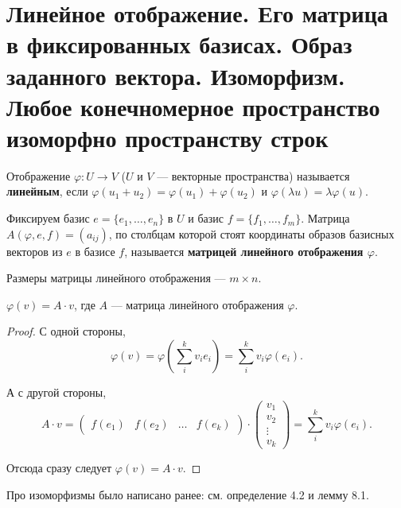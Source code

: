 \section{Линейное отображение. Его матрица в фиксированных базисах. Образ заданного вектора. Изоморфизм. Любое конечномерное пространство изоморфно пространству строк}

\begin{definition}
    Отображение $\varphi: U \rightarrow V$ ($U$ и $V$ --- векторные пространства) называется \textbf{линейным}, если $\varphi(u_1 + u_2) = \varphi(u_1) + \varphi(u_2)$ и $\varphi(\lambda u) = \lambda\varphi(u)$.
\end{definition}

\begin{definition}
    Фиксируем базис $e = \{e_1, \ldots, e_n\}$ в $U$ и базис $f = \{f_1, \ldots, f_m\}$. Матрица $A(\varphi, e, f) = (a_{ij})$, по столбцам которой стоят координаты образов базисных векторов из $e$ в базисе $f$, называется \textbf{матрицей линейного отображения $\varphi$}.
\end{definition}

\begin{remark}
    Размеры матрицы линейного отображения --- $m \times n$.
\end{remark}

\begin{statement}
    $\varphi(v) = A \cdot v$, где $A$ --- матрица линейного отображения $\varphi$.
\end{statement}

\begin{proof}
    С одной стороны,
    $$
    \varphi(v) = \varphi\left(\sum_i^kv_ie_i\right) = \sum_i^kv_i\varphi(e_i).
    $$

    А с другой стороны,
    $$
    A \cdot v = 
    \begin{pmatrix}
        f(e_1) & f(e_2) & \ldots & f(e_k)
    \end{pmatrix} \cdot
    \begin{pmatrix}
        v_1\\
        v_2\\
        \vdots\\
        v_k
    \end{pmatrix} = \sum_i^kv_i\varphi(e_i).
    $$

    Отсюда сразу следует $\varphi(v) = A \cdot v$.
\end{proof}

Про изоморфизмы было написано ранее: см. определение 4.2 и лемму 8.1.


